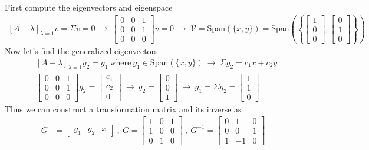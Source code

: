 \documentclass[twoside]{article}
\begin{document}
% 
First compute the eigenvectors and eigenspace 
%
\begin{align*}
 \left[ A - \lambda \right]_{\lambda = 1} v = \Sigma v = 0 \ \rightarrow \ 
 \left[ \begin{array}{ccc} 0 & 0 & 1 \\ 0 & 0 & 1 \\ 0 & 0 & 0 \end{array} \right] v = 0 \ \rightarrow \ \mathcal{V} = \mathrm{Span} \left( \lbrace x , y \rbrace  \right)
= \mathrm{Span} \left( \left\lbrace \left[ \begin{array}{c} 1 \\ 0  \\ 0  \end{array} \right] ,  \left[ \begin{array}{c} 0 \\ 1  \\ 0  \end{array} \right] \right\rbrace \right)
\end{align*}
%
%
Now let's find the generalized eigenvectors
%
\begin{align*}
&\left[ A - \lambda \right]_{\lambda = 1} g_2 = g_1 \ \mathrm{where} \ g_1 \in \mathrm{Span} \left( \lbrace x , y \rbrace  \right)
\ \rightarrow \ \Sigma g_2 = c_1 x + c_2 y
\\
 & \left[ \begin{array}{ccc} 0 & 0 & 1 \\ 0 & 0 & 1 \\ 0 & 0 & 0 \end{array} \right] g_2 =  \left[ \begin{array}{c} c_1 \\ c_2 \\ 0  \end{array} \right] \ \rightarrow \ 
  g_2 =   \left[ \begin{array}{c} 0 \\ 0  \\ 1 \end{array} \right] \ \rightarrow \  g_1 = \Sigma g_2 =  \left[ \begin{array}{c} 1 \\ 1  \\ 0 \end{array} \right] 
\end{align*}
%
Thus we can construct a transformation matrix and its inverse as
\begin{align*}
 G &= \left[ \begin{array}{cccc} g_1 & g_2 & x  \end{array} \right]
 \ , \ 
 G = \left[ \begin{array}{ccc} 1 & 0 & 1 \\ 1 & 0 & 0  \\ 0 & 1 & 0  \end{array} \right]
 \  , \ 
 G^{-1} = \left[ \begin{array}{ccc} 0 & 1 & 0 \\ 0 & 0 & 1  \\ 1 & -1 & 0 \end{array} \right]
\end{align*}
\end{document}
